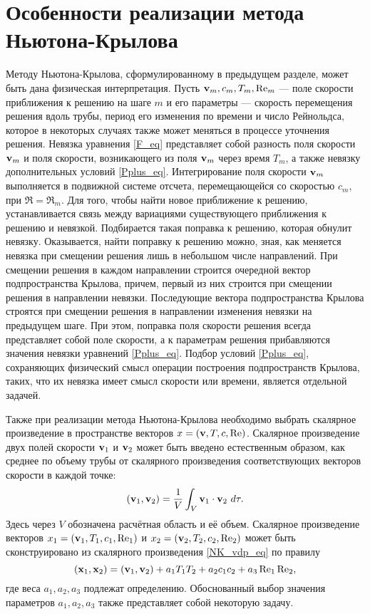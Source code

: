 \section{Особенности реализации метода Ньютона-Крылова}

Методу Ньютона-Крылова, сформулированному в предыдущем разделе, может быть дана физическая интерпретация. Пусть $\mathbf{v}_m, c_m, T_m, \operatorname{Re}_m$ --- поле скорости приближения к решению на шаге $m$ и его параметры --- скорость перемещения решения вдоль трубы, период его изменения по времени и число Рейнольдса, которое в некоторых случаях также может меняться в процессе уточнения решения. Невязка уравнения \eqref{F_eq} представляет собой разность поля скорости $\mathbf{v}_m$ и поля скорости, возникающего из поля $\mathbf{v}_m$ через время $T_m$, а также невязку дополнительных условий \eqref{Pplus_eq}. Интегрирование поля скорости $\mathbf{v}_m$ выполняется в подвижной системе отсчета, перемещающейся со скоростью $c_m$, при $\Re = \Re_m$. Для того, чтобы найти новое приближение к решению, устанавливается связь между вариациями существующего приближения к решению и невязкой. Подбирается такая поправка к решению, которая обнулит невязку. Оказывается, найти поправку к решению можно, зная, как меняется невязка при смещении решения лишь в небольшом числе направлений. При смещении решения в каждом направлении строится очередной вектор подпространства Крылова, причем, первый из них строится при смещении решения в направлении невязки. Последующие вектора подпространства Крылова строятся при смещении решения в направлении изменения невязки на предыдущем шаге. При этом, поправка поля скорости решения всегда представляет собой поле скорости, а к параметрам решения прибавляются значения невязки уравнений \eqref{Pplus_eq}. Подбор условий \eqref{Pplus_eq}, сохраняющих физический смысл операции построения подпространств Крылова, таких, что их невязка имеет смысл скорости или времени, является отдельной задачей. 

Также при реализации метода Ньютона-Крылова необходимо выбрать скалярное произведение в пространстве векторов $x = (\mathbf{v}, T, c, \operatorname{Re})$. Скалярное произведение двух полей скорости $\mathbf{v}_1$ и $\mathbf{v}_2$ может быть введено естественным образом, как среднее по объему трубы от скалярного произведения соответствующих векторов скорости в каждой точке:
\begin{equation} \label{NK_vdp_eq}
(\mathbf{v}_1, \mathbf{v}_2) =  \frac{1}{V} \int_{V} \mathbf{v}_1 \cdot \mathbf{v}_2 \ d\tau .
\end{equation}
Здесь через $V$ обозначена расчётная область и её объем. Скалярное произведение векторов $x_1 = (\mathbf{v}_1, T_1, c_1, \operatorname{Re}_1)$ и $x_2 = (\mathbf{v}_2, T_2, c_2, \operatorname{Re}_2)$ может быть сконструировано из скалярного произведения \eqref{NK_vdp_eq} по правилу
\begin{equation}
(\mathbf{x}_1, \mathbf{x}_2) = (\mathbf{v}_1, \mathbf{v}_2) + a_1 T_1 T_2 + a_2 c_1 c_2 + a_3 \operatorname{Re}_1 \operatorname{Re}_2,
\end{equation} 
где веса $a_1, a_2, a_3$ подлежат определению. Обоснованный выбор значения параметров $a_1, a_2, a_3$ также представляет собой некоторую задачу. 

